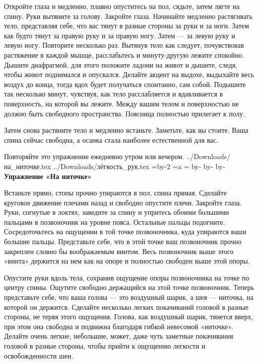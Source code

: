 Откройте глаза и медленно, плавно опуститесь на пол, сядьте, затем лягте на спину. Руки вытяните за голову. Закройте глаза. Начинайте медленно растягивать тело, представляя себе, что вас тянут в разные стороны за руки и за ноги. Затем как будто тянут за правую руку и за правую ногу. Затем --- за левую руку и левую ногу. Повторите несколько раз. Вытянув тело как следует, почувствовав растяжение в каждой мышце, расслабьтесь и минуту-другую лежите спокойно. Дышите диафрагмой, для этого положите ладони на живот и дышите, следя, чтобы живот поднимался и опускался. Делайте акцент на выдохе, выдыхайте весь воздух до конца, тогда вдох будет получаться спонтанно, сам собой. Подышите так несколько минут, чувствуя, как тело расслабляется
и вдавливается в поверхность, на которой вы лежите.
Между вашим телом и поверхностью не должно быть свободного пространства. Поясница полностью прилегает к полу.

Затем снова растяните тело и медленно встаньте. Заметьте, как вы стоите. Ваша спина сейчас свободна, а осанка стала наиболее естественной для вас.

Повторяйте это упражнение ежедневно утром или вечером.
\bye
../Downloads/на_ниточке.tex
../Downloads/лёгкость_рук.tex
\pdfhorigin=14mm \hsize=\pdfpagewidth \advance\hsize by-2\pdfhorigin
\pdfvorigin=12mm =\hbox{a} =\topskip \advance{} by-
  \advance\pdfvorigin by-
\vsize=285mm \advance\vsize by-\pdfvorigin
\nopagenumbers
{\bf Упражнение «На ниточке»}

Встаньте прямо, стопы прочно упираются в пол, спина прямая. Сделайте круговое движение плечами
назад и свободно опустите плечи. Закройте глаза. Руки, согнутые в локтях, заведите за спину и
упритесь обоими большими пальцами в позвоночник на уровне пояса. Остальные пальцы подогните.
Сосредоточьтесь на ощущении в той точке позвоночника, куда упираются ваши большие пальцы.
Представьте себе, что в этой точке ваш позвоночник прочно закреплен словно бы воображаемым винтом. Весь позвоночник выше этого «винта» держится на нем как на опоре и полностью свободен выше этой опоры.

Опустите руки вдоль тела, сохранив ощущение опоры позвоночника на точке по центру спины. Ощутите
свободно держащийся на этой точке позвоночник. Теперь представьте себе, что ваша голова --- это
воздушный шарик, а шея --- ниточка, на которой он держится. Сделайте несколько легких покачиваний
головой в разные стороны, не теряя этого ощущения. Голова, как воздушный шарик, тянется вверх, при этом она свободна и подвижна благодаря гибкой невесомой «ниточке». Делайте очень легкие, небольшие,
может, даже чуть заметные покачивания головой в разные стороны, чтобы прийти к ощущению легкости и освобожденности шеи.

